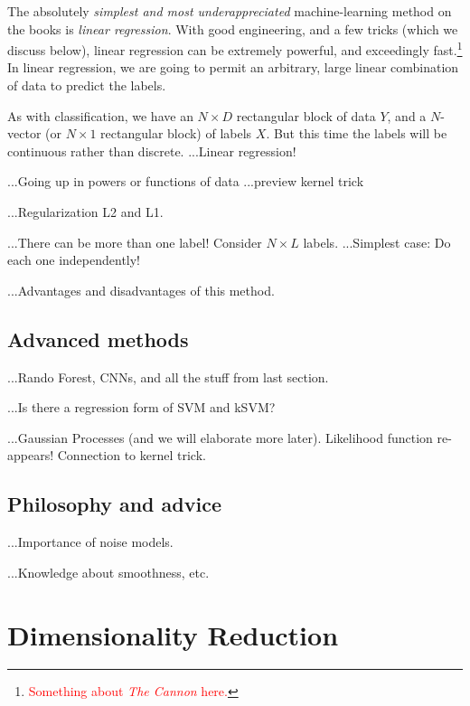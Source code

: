 \documentclass[12pt, twoside, letterpaper]{article}
\newcommand{\project}[1]{\textsl{#1}}
\newcommand{\todo}[1]{\textcolor{red}{#1}}  %
\begin{document}
The absolutely \emph{simplest and most underappreciated} machine-learning
method on the books is \emph{linear regression}.
With good engineering, and a few tricks (which we discuss below), linear
regression can be extremely powerful, and exceedingly fast.\footnote{%
  \todo{Something about \project{The Cannon} here.}}
In linear regression,
we are going to permit an arbitrary, large linear combination of data to predict
the labels.

As with classification, we have an $N\times D$ rectangular block of data $Y$,
and a $N$-vector (or $N\times 1$ rectangular block) of labels $X$.
But this time the labels will be continuous rather than discrete.
...Linear regression!

...Going up in powers or functions of data
...preview kernel trick

...Regularization L2 and L1.

...There can be more than one label! Consider $N\times L$ labels.
...Simplest case: Do each one independently!

...Advantages and disadvantages of this method.

\subsection{Advanced methods}

...Rando Forest, CNNs, and all the stuff from last section.

...Is there a regression form of SVM and kSVM?

...Gaussian Processes (and we will elaborate more later).
Likelihood function re-appears!
Connection to kernel trick.

\subsection{Philosophy and advice}

...Importance of noise models.

...Knowledge about smoothness, etc.

\section{Dimensionality Reduction}
\end{document}
